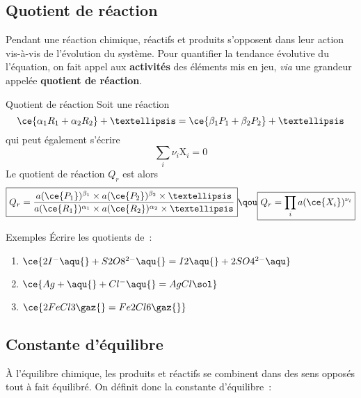 \documentclass[../main/main.tex]{subfiles}
\begin{document}
\subsection{Quotient de réaction}

Pendant une réaction chimique, réactifs et produits s'opposent dans leur action
vis-à-vis de l'évolution du système.
Pour quantifier la tendance évolutive du l'équation, on fait appel aux
\textbf{activités} des éléments mis en jeu, \textit{via} une grandeur appelée
\textbf{quotient de réaction}.

\begin{defi}[label=quoreac]{Quotient de réaction}
    Soit une réaction
    \[\ce{\alpha_1R_1 + \alpha_2R_2} +…
            =
        \ce{\beta_1P_1 +\beta_2P_2}+…\]
    qui peut également s'écrire
    \[ \sum_i \nu_i\mathrm{X}_i = 0\]
    Le quotient de réaction $Q_r$ est alors
    \[\boxed{Q_r = \frac{a(\ce{P_1})^{\beta_1} \times
                         a(\ce{P_2})^{\beta_2} \times…}{
                         a(\ce{R_1})^{\alpha_1} \times
                         a(\ce{R_2})^{\alpha_2} \times…}}
      \qou
      \boxed{Q_r = \prod_i a(\ce{X_i})^{\nu_i}}
    \]
\end{defi}

\begin{exem}[label=exem:qr, sidebyside, righthand ratio=.45]{Exemples}
    Écrire les quotients de~:
    \begin{enumerate}
        \item $\ce{2I^-\aqu{} + S2O8^{2-}\aqu{} = I2\aqu{} +2SO4^{2-}\aqu}$
        \item $\ce{Ag+\aqu{} + Cl^-\aqu{} = AgCl\sol}$
        \item $\ce{2FeCl3\gaz{} = Fe2Cl6\gaz{}}$
    \end{enumerate}
    \vspace{-12pt}
\end{exem}

\subsection{Constante d'équilibre}
À l'équilibre chimique, les produits et réactifs se combinent dans des sens
opposés tout à fait équilibré. On définit donc la constante d'équilibre~:
\end{document}
